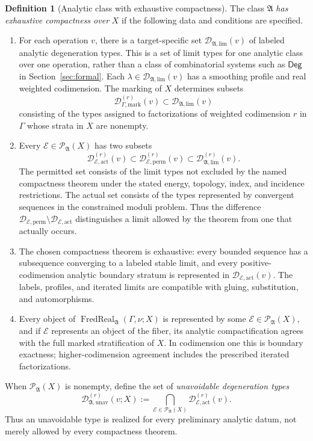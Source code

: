 \documentclass[11pt,letterpaper,twoside]{article}
\theoremstyle{plain}
\theoremstyle{definition}
\newtheorem{definition}[theorem]{Definition}
\theoremstyle{remark}
\newcommand{\Deg}{\mathsf{Deg}}
\begin{document}
\begin{definition}[Analytic class with exhaustive compactness]\label{def:compactness-exhaustive}
The class $\mathfrak A$ \emph{has exhaustive compactness over} $X$ if the following data and conditions are specified.
\begin{enumerate}
\item For each operation $v$, there is a target-specific set $\mathcal D_{\mathfrak A,\mathrm{lim}}(v)$ of labeled analytic degeneration types.  This is a set of limit types for one analytic class over one operation, rather than a class of combinatorial systems such as $\Deg$ in Section~\ref{sec:formal}.  Each $\lambda\in\mathcal D_{\mathfrak A,\mathrm{lim}}(v)$ has a smoothing profile and real weighted codimension.  The marking of $X$ determines subsets
\[
 \mathcal D^{(r)}_{\Gamma,\mathrm{mark}}(v)
 \subset\mathcal D_{\mathfrak A,\mathrm{lim}}(v)
\]
consisting of the types assigned to factorizations of weighted codimension $r$ in $\Gamma$ whose strata in $X$ are nonempty.
\item Every $\mathcal E\in\mathcal P_{\mathfrak A}(X)$ has two subsets
\[
 \mathcal D^{(r)}_{\mathcal E,\mathrm{act}}(v)
 \subset
 \mathcal D^{(r)}_{\mathcal E,\mathrm{perm}}(v)
 \subset
 \mathcal D^{(r)}_{\mathfrak A,\mathrm{lim}}(v).
\]
The permitted set consists of the limit types not excluded by the named compactness theorem under the stated energy, topology, index, and incidence restrictions.  The actual set consists of the types represented by convergent sequences in the constrained moduli problem.  Thus the difference $\mathcal D_{\mathcal E,\mathrm{perm}}\setminus\mathcal D_{\mathcal E,\mathrm{act}}$ distinguishes a limit allowed by the theorem from one that actually occurs.
\item The chosen compactness theorem is exhaustive: every bounded sequence has a subsequence converging to a labeled stable limit, and every positive-codimension analytic boundary stratum is represented in $\mathcal D_{\mathcal E,\mathrm{act}}(v)$.  The labels, profiles, and iterated limits are compatible with gluing, substitution, and automorphisms.
\item Every object of $\operatorname{FredReal}_{\mathfrak A}(\Gamma,\nu;X)$ is represented by some $\mathcal E\in\mathcal P_{\mathfrak A}(X)$, and if $\mathcal E$ represents an object of the fiber, its analytic compactification agrees with the full marked stratification of $X$.  In codimension one this is boundary exactness; higher-codimension agreement includes the prescribed iterated factorizations.
\end{enumerate}
When $\mathcal P_{\mathfrak A}(X)$ is nonempty, define the set of \emph{unavoidable degeneration types}
\begin{equation}\label{eq:forced-compactness-types}
 \mathcal D^{(r)}_{\mathfrak A,\mathrm{unav}}(v;X)
 :=\bigcap_{\mathcal E\in\mathcal P_{\mathfrak A}(X)}
 \mathcal D^{(r)}_{\mathcal E,\mathrm{act}}(v).
\end{equation}
Thus an unavoidable type is realized for every preliminary analytic datum, not merely allowed by every compactness theorem.
\end{definition}
\end{document}
